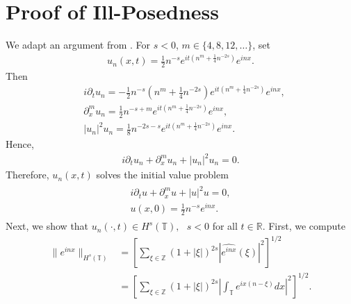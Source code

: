 \documentclass[12pt,reqno]{amsart}
\numberwithin{equation}{section}  %
\numberwithin{figure}{section}
\newcommand{\rr}{\mathbb{R}}
\newcommand{\zz}{\mathbb{Z}}
\newcommand{\ci}{\mathbb{T}}
\newcommand{\wh}{\widehat}
\newcommand{\p}{\partial}
\theoremstyle{plain}
\theoremstyle{definition}
\theoremstyle{remark}
\begin{document}
\section{Proof of Ill-Posedness}
We adapt an argument from \cite{Burq_Gerad_Tzvetkov-An-instability-}. For $s<0$,
$m \in \{4, 8, 12, \dots\}$, set
%
%
%
%
\begin{equation}
	\label{ill-soln}
	\begin{split}
		u_{n}(x,t)=\frac{1}{2 }n^{-s}e^{it\left( n^{m}+\frac{1}{4}n^{-2s}
		\right)}e^{inx}.
	\end{split}
\end{equation}
%
%
Then
%
%
\begin{equation*}
	\begin{split}
		& i \p_t u_{n}
		= -\frac{1}{2 }n^{-s}\left( n^{m}+\frac{1}{4}n^{-2s} \right)e^{it\left(
		n^{m}+ \frac{1}{4}n^{-2s} \right)}e^{inx},
		\\
		& \p_x^{m}u_{n}  = \frac{1}{2 }n^{-s+m}e^{it\left(
		n^{m}+\frac{1}{4}n^{-2s} \right)}e^{inx},
		\\
		& | u_{n} |^{2}u_{n}  = \frac{1}{8 }n^{-2s-s}e^{it\left(
		n^{m}+\frac{1}{4}n^{-2s} \right)}e^{inx}.
	\end{split}
\end{equation*}
%
%
Hence,
%
%
\begin{equation*}
	\begin{split}
		i \p_t u_{n} + \p_x^{m}u_{n} + | u_{n} |^{2} u_{n}
		=0.
	\end{split}
\end{equation*}
%
%
Therefore, $u_{n}(x,t)$ solves the initial value problem
%
%
\begin{gather*}
	\begin{split}
		i \p_t u + \p_x^m u + | u |^{2}u = 0,
		\\
    u(x,0) = \frac{1}{2 }n^{-s}e^{inx}.
	\end{split}
\end{gather*}
%
%
Next, we show that $u_{n}(\cdot, t) \in H^{s}(\ci), \text{ } s < 0$ for all $t
\in \rr$.  First, we compute
%
%
\begin{equation*}
	\begin{split}
		\|e^{inx}\|_{H^{s}(\ci)}
		& =  \left[ \sum_{\xi \in \zz} \left( 1+ | \xi |
		\right)^{2s} | \wh{e^{inx}}(\xi) |^{2} \right]^{1/2}
		\\
		& =  \left[ \sum_{\xi \in \zz} \left( 1 + | \xi | \right)^{2s} |
		\int_{\ci}e^{ix(n- \xi)}dx |^{2}\right]^{1/2}.
	\end{split}
\end{equation*}
\end{document}
